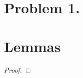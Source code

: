 \documentclass[12pt]{extarticle}
\begin{document}
 
\section*{Problem 1.}
     
              
\section*{Lemmas}

\begin{lemma} \label{prodcompac}

\end{lemma}

\begin{proof}
 
\end{proof}
\end{document}
